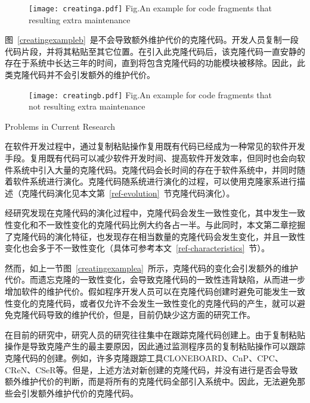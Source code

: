 \begin{figure}[htbp]
\centering
\texttt{[image: creatinga.pdf]}
{Fig.$\!$}{An example for code fragments that resulting extra maintenance}
\vspace{-1em}
\end{figure}

图~\ref{creatingexampleb}~是不会导致额外维护代价的克隆代码。开发人员复制一段代码片段，并将其粘贴至其它位置。在引入此克隆代码后，该克隆代码一直安静的存在于系统中长达三年的时间，直到将包含克隆代码的功能模块被移除。因此，此类克隆代码并不会引发额外的维护代价。

\begin{figure}[htbp]
\centering
\texttt{[image: creatingb.pdf]}
{Fig.$\!$}{An example for code fragments that not resulting extra maintenance}
\vspace{-1em}
\end{figure}

{Problems in Current Research}

在软件开发过程中，通过复制粘贴操作复用既有代码已经成为一种常见的软件开发手段\cite{koschke2007survey}。复用既有代码可以减少软件开发时间、提高软件开发效率，但同时也会向软件系统中引入大量的克隆代码。克隆代码会长时间的存在于软件系统中，并同时随着软件系统进行演化。克隆代码随系统进行演化的过程，可以使用克隆家系进行描述\cite{kim2005empirical}（克隆代码演化见本文第~\ref{ref-evolution}~节克隆代码演化）。

经研究发现在克隆代码的演化过程中，克隆代码会发生一致性变化\cite{saha2011automatic}，其中发生一致性变化和不一致性变化的克隆代码比例大约各占一半\cite{krinke2007study}。与此同时，本文第二章挖掘了克隆代码的演化特征，也发现存在相当数量的克隆代码会发生变化，并且一致性变化也会多于不一致性变化（具体可参考本文~\ref{ref-characteristics}~节）。

然而，如上一节图~\ref{creatingexamplea}~所示，克隆代码的变化会引发额外的维护代价。而遗忘克隆的一致性变化，会导致克隆代码的一致性违背缺陷，从而进一步增加软件的维护代价\cite{aversano2007clones}\cite{bettenburg2009empirical}。假如程序开发人员可以在克隆代码创建时避免可能发生一致性变化的克隆代码，或者仅允许不会发生一致性变化的克隆代码的产生，就可以避免克隆代码导致的维护代价，但是，目前仍缺少这方面的研究工作。

在目前的研究中，研究人员的研究往往集中在跟踪克隆代码创建上。由于复制粘贴操作是导致克隆产生的最主要原因，因此通过监测程序员的复制粘贴操作可以跟踪克隆代码的创建。例如，许多克隆跟踪工具CLONEBOARD\cite{de2009managing}、CnP\cite{hou2009cnp}、CPC\cite{weckerle2008cpc}、CReN\cite{jablonski2007cren}、CSeR\cite{jacob2010actively}等。但是，上述方法对新创建的克隆代码，并没有进行是否会导致额外维护代价的判断，而是将所有的克隆代码全部引入系统中。因此，无法避免那些会引发额外维护代价的克隆代码。

